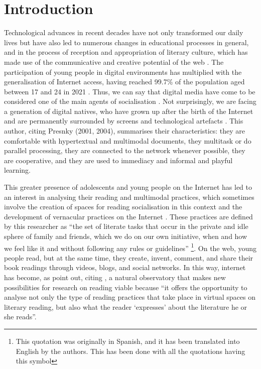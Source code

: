 \documentclass[english]{textolivre}
\begin{document}
\section{Introduction}\label{sec-intro}

Technological advances in recent decades have not only transformed our daily lives but have also led to numerous changes in educational processes in general, and in the process of reception and appropriation of literary culture, which has made use of the communicative and creative potential of the web \cite{paladines-paredes_videoresenas_2021a}. The participation of young people in digital environments has multiplied with the generalisation of Internet access, having reached 99.7\% of the population aged between 17 and 24 in 2021 \cite{instituto_nacional_de_estadistica_ine_encuesta_2021}. Thus, we can say that digital media have come to be considered one of the main agents of socialisation \cite{gordo_lopez_jovenes_2018}. Not surprisingly, we are facing a generation of digital natives, who have grown up after the birth of the Internet and are permanently surrounded by screens and technological artefacts \cite{cassany_en_linea._2012}. This author, citing Presnky (2001, 2004), summarises their characteristics: they are comfortable with hypertextual and multimodal documents, they multitask or do parallel processing, they are connected to the network whenever possible, they are cooperative, and they are used to immediacy and informal and playful learning.

This greater presence of adolescents and young people on the Internet has led to an interest in analysing their reading and multimodal practices, which sometimes involve the creation of spaces for reading socialisation in this context and the development of vernacular practices on the Internet \cite{cassany_en_linea._2012}. These practices are defined by this researcher as “the set of literate tasks that occur in the private and idle sphere of family and friends, which we do on our own initiative, when and how we feel like it and without following any rules or guidelines” \cite[p. 92]{cassany_en_linea._2012}\footnote{This quotation was originally in Spanish, and it has been translated into English by the authors. This has been done with all the quotations having this symbol}. On the web, young people read, but at the same time, they create, invent, comment, and share their book readings through videos, blogs, and social networks. In this way, internet has become, as \textcite{manresa_practicas_2016} point out, citing \textcite[p. 54]{leveratto_internet_2008}, a natural observatory that makes new possibilities for research on reading viable because “it offers the opportunity to analyse not only the type of reading practices that take place in virtual spaces on literary reading, but also what the reader ‘expresses’ about the literature he or she reads”.
\end{document}
